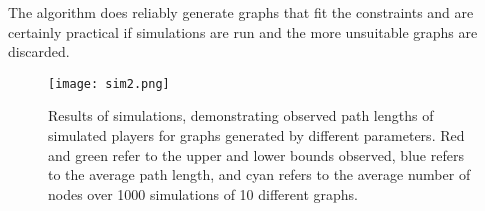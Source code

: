\documentclass[landscape, a0, final]{a0poster}
\begin{document}
\begin{minipage}{0.25\linewidth}
\begin{minipage}{0.8\linewidth}
The algorithm does reliably generate graphs that fit the constraints and are certainly practical if simulations are run and the more unsuitable graphs are discarded.

\centering 
    \begin{figure}[H]
        \centering
        \texttt{[image: sim2.png]} 
            \caption{Results of simulations, demonstrating observed path lengths of simulated players for graphs generated by different parameters.  Red and green refer to the upper and lower bounds observed, blue refers to the average path length, and cyan refers to the average number of nodes over 1000 simulations of 10 different graphs.} 
            \label{sim2}
    \end{figure}


\end{minipage} %
\end{minipage} %
\end{document}
